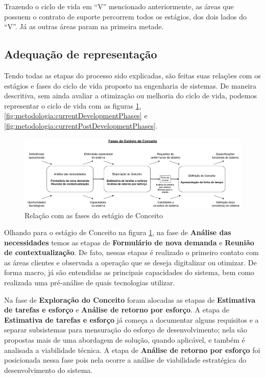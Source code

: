 	Trazendo o ciclo de vida em ``V'' mencionado anteriormente, as áreas que possuem o contrato de suporte percorrem todos os estágios, dos dois lados do ``V''. Já as outras áreas param na primeira metade.

	\subsection{Adequação de representação}

	Tendo todas as etapas do processo sido explicadas, são feitas suas relações com os estágios e fases do ciclo de vida proposto na engenharia de sistemas.  
	De maneira descritiva, sem ainda avaliar a otimização ou melhoria do ciclo de vida, podemos representar o ciclo de vida com as figuras \ref{fig:metodologia:currentConceptPhases}, \ref{fig:metodologia:currentDevelopmentPhases} e \ref{fig:metodologia:currentPostDevelopmentPhases}.

	\begin{figure}[h]
		\centering
		\includegraphics[width=\textwidth]{./figuras/currentConceptPhases.pdf}
		\caption{Relação com as fases do estágio de Conceito}
		\label{fig:metodologia:currentConceptPhases}
	\end{figure}

	Olhando para o estágio de Conceito na figura \ref{fig:metodologia:currentConceptPhases}, na fase de \textbf{Análise das necessidades} temos as etapas de \textbf{Formulário de nova demanda} e \textbf{Reunião de contextualização}. De fato, nessas etapas é realizado o primeiro contato com as áreas clientes e observada a operação que se deseja digitalizar ou otimizar. De forma macro, já são entendidas as principais capacidades do sistema, bem como realizada uma pré-análise de quais tecnologias utilizar.

	Na fase de \textbf{Exploração do Conceito} foram alocadas as etapas de \textbf{Estimativa de tarefas e esforço} e \textbf{Análise de retorno por esforço}. A etapa de \textbf{Estimativa de tarefas e esforço} já começa a documentar alguns requisitos e a separar subsistemas para mensuração do esforço de desenvolvimento; nela são propostas mais de uma abordagem de solução, quando aplicável, e também é analisada a viabilidade técnica. A etapa de \textbf{Análise de retorno por esforço} foi posicionada nessa fase pois nela ocorre a análise de viabilidade estratégica do desenvolvimento do sistema.

